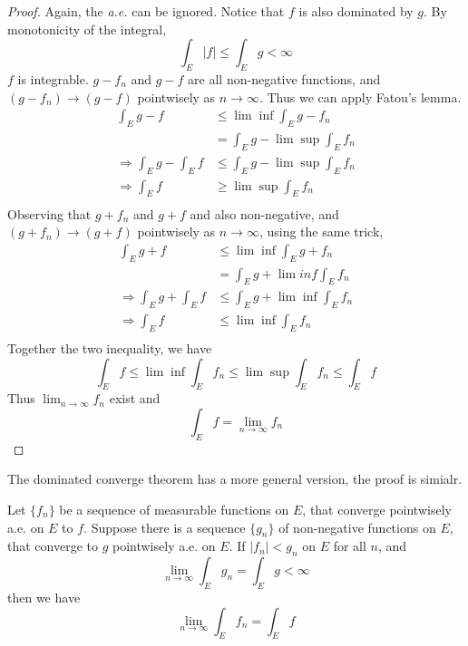 \documentclass[lang=en, 12pt]{elegantbook}
\begin{document}
        \begin{proof}
            Again, the \textsl{a.e.} can be ignored. Notice that $f$ is also dominated by $g$. By monotonicity of the integral,
            $$\int_E |f| \leq \int_E g < \infty$$
        $f$ is integrable.
            $g-f_n$ and $g-f$ are all non-negative functions, and $(g-f_n) \to (g-f)$ pointwisely as $n \to \infty$. Thus we can apply 
        Fatou's lemma.
            \begin{equation*}
                \begin{aligned}
                    \int_E g-f &\leq \lim \inf \int_E g -f_n \\            
                    &= \int_E g - \lim \sup \int_E f_n\\
                    \Rightarrow \int_E g- \int_E f &\leq \int_E g - \lim \sup \int_E f_n\\
                    \Rightarrow \int_E f &\geq \lim \sup \int_E f_n\\
                \end{aligned}
            \end{equation*}
        Observing that $g+ f_n$ and $g+f$ and also non-negative, and $(g+f_n) \to (g+f)$ pointwisely as $n \to \infty$,
        using the same trick,
            \begin{equation*}
                \begin{aligned}
                    \int_E g+f &\leq \lim \inf \int_E g +f_n \\            
                    &= \int_E g + \lim inf \int_E f_n\\
                    \Rightarrow \int_E g+ \int_E f &\leq \int_E g + \lim \inf \int_E f_n\\
                    \Rightarrow \int_E f &\leq \lim \inf \int_E f_n\\
                \end{aligned}
            \end{equation*}
        Together the two inequality, we have 
            $$\int_E f \leq \lim \inf \int_E f_n \leq \lim \sup \int_E f_n \leq \int_E f$$
        Thus $\lim_{n\to \infty} f_n$ exist and 
        $$\int_E f = \lim_{n\to \infty} f_n$$ 
        \end{proof}
        The dominated converge theorem has a more general version, the proof is simialr. 
        \begin{theorem}
            Let $\{f_n\}$ be a sequence of measurable functions on $E$, that converge pointwisely a.e. on $E$ to $f$. Suppose there is a 
        sequence $\{g_n\}$ of non-negative functions on $E$, that converge to $g$ pointwisely a.e. on $E$. If $|f_n|<g_n$ on $E$ for all $n$,
        and $$\lim_{n\to \infty} \int_E g_n = \int_E g < \infty$$
        then we have 
        $$\lim_{n \to \infty} \int_E f_n = \int_E f$$
        \end{theorem}
\end{document}
